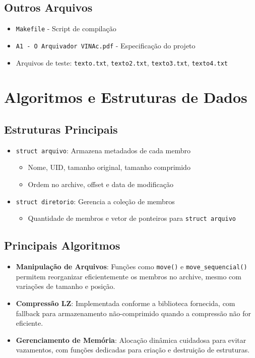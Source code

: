 \documentclass{article}
\begin{document}
\subsection{Outros Arquivos}
\begin{itemize}
    \item \texttt{Makefile} - Script de compilação
    \item \texttt{A1 - O Arquivador VINAc.pdf} - Especificação do projeto
    \item Arquivos de teste: \texttt{texto.txt}, \texttt{texto2.txt}, \texttt{texto3.txt}, \texttt{texto4.txt}
\end{itemize}

\section{Algoritmos e Estruturas de Dados}
\subsection{Estruturas Principais}
\begin{itemize}
    \item \texttt{struct arquivo}: Armazena metadados de cada membro
    \begin{itemize}
        \item Nome, UID, tamanho original, tamanho comprimido
        \item Ordem no archive, offset e data de modificação
    \end{itemize}
    \item \texttt{struct diretorio}: Gerencia a coleção de membros
    \begin{itemize}
        \item Quantidade de membros e vetor de ponteiros para \texttt{struct arquivo}
    \end{itemize}
\end{itemize}

\subsection{Principais Algoritmos}
\begin{itemize}
    \item \textbf{Manipulação de Arquivos}: Funções como \texttt{move()} e \texttt{move\_sequencial()} permitem reorganizar eficientemente os membros no archive, mesmo com variações de tamanho e posição.
    \item \textbf{Compressão LZ}: Implementada conforme a biblioteca fornecida, com fallback para armazenamento não-comprimido quando a compressão não for eficiente.
    \item \textbf{Gerenciamento de Memória}: Alocação dinâmica cuidadosa para evitar vazamentos, com funções dedicadas para criação e destruição de estruturas.
\end{itemize}
\end{document}
